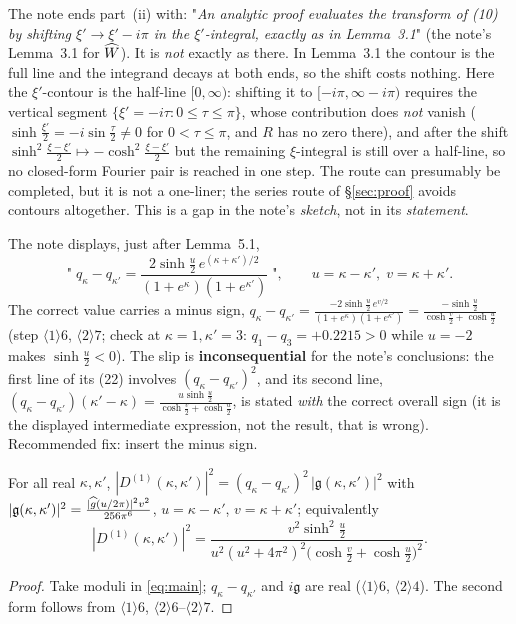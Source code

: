 \documentclass[11pt]{article}
\newcommand{\gfr}{\mathfrak g}\newcommand{\Dt}{\widetilde D^{(1)}}\newcommand{\psih}{\psi}
\begin{document}
\begin{remark}\label{rem:contour}
The note ends part~(ii) with: "\emph{An analytic proof evaluates the transform of (10) by
shifting \(\xi'\to\xi'-i\pi\) in the \(\xi'\)-integral, exactly as in Lemma~3.1}"
(the note's Lemma~3.1 for \(\widehat W\)).  It is \emph{not} exactly as there.  In Lemma~3.1 the contour is
the full line and the integrand decays at both ends, so the shift costs nothing.  Here the
\(\xi'\)-contour is the half-line \([0,\infty)\): shifting it to \([-i\pi,\infty-i\pi)\) requires
the vertical segment \(\{\xi'=-i\tau:0\le\tau\le\pi\}\), whose contribution does \emph{not} vanish
(\(\sinh\frac{\xi'}2=-i\sin\frac\tau2\neq0\) for \(0<\tau\le\pi\), and \(R\) has no zero there), and
after the shift \(\sinh^2\frac{\xi-\xi'}2\mapsto-\cosh^2\frac{\xi-\xi'}2\) but the remaining
\(\xi\)-integral is still over a half-line, so no closed-form Fourier pair is reached in one step.
The route can presumably be completed, but it is not a one-liner; the series route of
\S\ref{sec:proof} avoids contours altogether.  This is a gap in the note's \emph{sketch}, not in its
\emph{statement}.
\end{remark}

\begin{remark}\label{rem:signslip}
The note displays, just after Lemma~5.1,
\[
 \text{"}\;q_\kappa-q_{\kappa'}=\frac{2\sinh\frac u2\,e^{(\kappa+\kappa')/2}}
 {(1+e^\kappa)(1+e^{\kappa'})}\;\text{"},\qquad u=\kappa-\kappa',\;v=\kappa+\kappa'.
\]
The correct value carries a minus sign,
\(q_\kappa-q_{\kappa'}=\frac{-2\sinh\frac u2\,e^{v/2}}{(1+e^\kappa)(1+e^{\kappa'})}
=\frac{-\sinh\frac u2}{\cosh\frac v2+\cosh\frac u2}\)
(step \(\langle1\rangle6\), \(\langle2\rangle7\); check at \(\kappa=1,\kappa'=3\):
\(q_1-q_3=+0.2215>0\) while \(u=-2\) makes \(\sinh\frac u2<0\)).  The slip is
\textbf{inconsequential} for the note's conclusions: the first line of its (22) involves
\((q_\kappa-q_{\kappa'})^2\), and its second line, \((q_\kappa-q_{\kappa'})(\kappa'-\kappa)
=\frac{u\sinh\frac u2}{\cosh\frac v2+\cosh\frac u2}\), is stated \emph{with} the correct overall
sign (it is the displayed intermediate expression, not the result, that is wrong).  Recommended fix:
insert the minus sign.
\end{remark}

\begin{corollary}\label{cor:thmA}
For all real \(\kappa,\kappa'\),
\(|D^{(1)}(\kappa,\kappa')|^2=(q_\kappa-q_{\kappa'})^2\,|\gfr(\kappa,\kappa')|^2\) with
\(|\gfr(\kappa,\kappa')|^2=\frac{|\gh(u/2\pi)|^2v^2}{256\pi^6}\), \(u=\kappa-\kappa'\),
\(v=\kappa+\kappa'\); equivalently
\[
 |D^{(1)}(\kappa,\kappa')|^2
 =\frac{v^2\sinh^2\frac u2}{u^2(u^2+4\pi^2)^2\bigl(\cosh\frac v2+\cosh\frac u2\bigr)^2}.
\]
\end{corollary}
\begin{proof}
Take moduli in \eqref{eq:main}; \(q_\kappa-q_{\kappa'}\) and \(i\gfr\) are real
(\(\langle1\rangle6\), \(\langle2\rangle4\)).  The second form follows from
\(\langle1\rangle6\), \(\langle2\rangle6\)--\(\langle2\rangle7\).
\end{proof}
\end{document}
